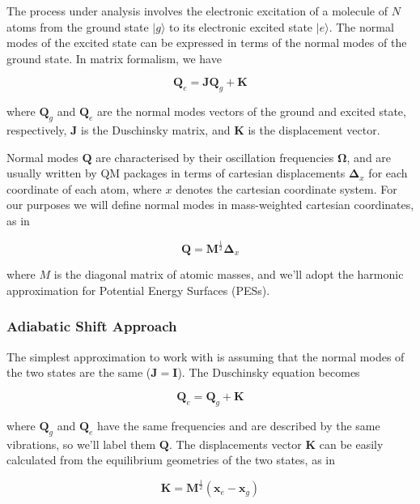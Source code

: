 \documentclass[a4paper]{article}
\newcommand{\matr}[1]{\mathbf{#1}}
\begin{document}
The process under analysis involves the electronic excitation of a molecule of $N$ atoms from the ground state $\vert g \rangle$ to its electronic excited state $\vert e \rangle$.
The normal modes of the excited state can be expressed in terms of the normal modes of the ground state. In matrix formalism, we have

\begin{equation}
\matr{Q}_e = \matr{JQ}_g + \matr{K}
\end{equation}

where $\matr{Q}_g$ and $\matr{Q}_e$ are the normal modes vectors of the ground and excited state, respectively, $\matr{J}$ is the Duschinsky matrix, and $\matr{K}$ is the displacement vector.

Normal modes $\matr{Q}$ are characterised by their oscillation frequencies $\matr{\Omega}$, and are usually written by QM packages in terms of cartesian displacements $\matr{\Delta}_x$ for each coordinate of each atom, where $x$ denotes the cartesian coordinate system. For our purposes we will define normal modes in mass-weighted cartesian coordinates, as in

\begin{equation}
\matr{Q} = \matr{M}^{\frac{1}{2}}\matr{\Delta}_x
\end{equation}

where $M$ is the diagonal matrix of atomic masses, and we'll adopt the harmonic approximation for Potential Energy Surfaces (PESs).

\subsubsection*{Adiabatic Shift Approach}

The simplest approximation to work with is assuming that the normal modes of the two states are the same ($\matr{J} = \matr{I}$). The Duschinsky equation becomes

\begin{equation}
\matr{Q}_e = \matr{Q}_g + \matr{K}
\end{equation}

where $\matr{Q}_g$ and $\matr{Q}_e$ have the same frequencies and are described by the same vibrations, so we'll label them $\matr{Q}$. The displacements vector $\matr{K}$ can be easily calculated from the equilibrium geometries of the two states, as in

\begin{equation}
\matr{K} = \matr{M}^{\frac{1}{2}}(\matr{x}_e - \matr{x}_g)
\end{equation}
\end{document}
